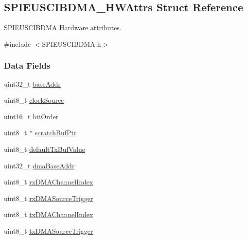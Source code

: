 \subsection{S\-P\-I\-E\-U\-S\-C\-I\-B\-D\-M\-A\-\_\-\-H\-W\-Attrs Struct Reference}
\label{struct_s_p_i_e_u_s_c_i_b_d_m_a___h_w_attrs}


S\-P\-I\-E\-U\-S\-C\-I\-B\-D\-M\-A Hardware attributes.  




{\ttfamily \#include $<$S\-P\-I\-E\-U\-S\-C\-I\-B\-D\-M\-A.\-h$>$}

\subsubsection*{Data Fields}
\begin{DoxyCompactItemize}
\item 
uint32\-\_\-t \hyperlink{struct_s_p_i_e_u_s_c_i_b_d_m_a___h_w_attrs_abcb08979f4f6514395d165403a23d100}{base\-Addr}
\item 
uint8\-\_\-t \hyperlink{struct_s_p_i_e_u_s_c_i_b_d_m_a___h_w_attrs_aadc46ff9966c16d3e8782588ee594f2c}{clock\-Source}
\item 
uint16\-\_\-t \hyperlink{struct_s_p_i_e_u_s_c_i_b_d_m_a___h_w_attrs_aedc1eb38d11274b1b32ccf88b11478f1}{bit\-Order}
\item 
uint8\-\_\-t $\ast$ \hyperlink{struct_s_p_i_e_u_s_c_i_b_d_m_a___h_w_attrs_a1bc0bb9638fffd6efdac516166eef7f5}{scratch\-Buf\-Ptr}
\item 
uint8\-\_\-t \hyperlink{struct_s_p_i_e_u_s_c_i_b_d_m_a___h_w_attrs_a6f0001b2be72f6afc2e5defc8a51d08c}{default\-Tx\-Buf\-Value}
\item 
uint32\-\_\-t \hyperlink{struct_s_p_i_e_u_s_c_i_b_d_m_a___h_w_attrs_aed70de0b11f45efaa4715cff4cf23834}{dma\-Base\-Addr}
\item 
uint8\-\_\-t \hyperlink{struct_s_p_i_e_u_s_c_i_b_d_m_a___h_w_attrs_a8ac5bb8492f71cb784577721ccfba7ad}{rx\-D\-M\-A\-Channel\-Index}
\item 
uint8\-\_\-t \hyperlink{struct_s_p_i_e_u_s_c_i_b_d_m_a___h_w_attrs_a7ba8e3280a483f1affacac0d603f8611}{rx\-D\-M\-A\-Source\-Trigger}
\item 
uint8\-\_\-t \hyperlink{struct_s_p_i_e_u_s_c_i_b_d_m_a___h_w_attrs_aebb1c494a4118fd5393db92c72f47770}{tx\-D\-M\-A\-Channel\-Index}
\item 
uint8\-\_\-t \hyperlink{struct_s_p_i_e_u_s_c_i_b_d_m_a___h_w_attrs_a683a8356a28b557d278d969bab6f1ef8}{tx\-D\-M\-A\-Source\-Trigger}
\end{DoxyCompactItemize}


